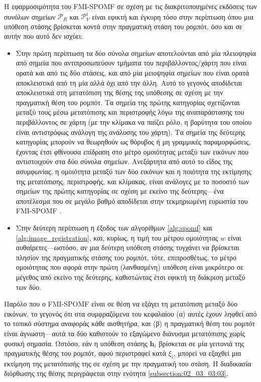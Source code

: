 Η εφαρμοσιμότητα του FMI-SPOMF σε σχέση με τις διακριτοποιημένες εκδόσεις των
συνόλων σημείων $\mathcal{P}_R$ και $\mathcal{P}_V^i$ είναι εφικτή και
έγκυρη τόσο στην περίπτωση όπου μια υπόθεση στάσης βρίσκεται κοντά στην
πραγματική στάση του ρομπότ, όσο και σε αυτήν που αυτό δεν ισχύει:

\begin{itemize}
  \item Στην πρώτη περίπτωση τα δύο σύνολα σημείων αποτελούνται
        από μία πλειοψηφία από σημεία που αντιπροσωπεύουν τμήματα του
        περιβάλλοντος/χάρτη που είναι ορατά και από τις δύο στάσεις, και από μία
        μειοψηφία σημείων που είναι ορατά αποκλειστικά από τη μία αλλά όχι από
        την άλλη. Αυτό το γεγονός αποδίδεται αποκλειστικά στη μετατόπιση της
        θέσης της υπόθεσης σε σχέση με την πραγματική θέση του ρομπότ. Τα
        σημεία της πρώτης κατηγορίας σχετίζονται μεταξύ τους μέσω
        μετατόπισης και περιστροφής λόγω της αναπαράστασης του περιβάλλοντος
        σε χάρτη (με την κλίμακα να παίζει ρόλο, η βαρύτητα του οποίου είναι
        αντιστρόφως ανάλογη της ανάλυσης του χάρτη). Τα σημεία της
        δεύτερης κατηγορίας μπορούν να θεωρηθούν ως θόρυβος ή μη γραμμικές
        παραμορφώσεις, έχοντας έτσι φθίνουσα επίδραση στο μέτρο ομοιότητας
        μεταξύ των εικόνων που αντιστοιχούν στα δύο σύνολα σημείων. Ανεξάρτητα
        από αυτό το είδος της ασυμφωνίας, η ομοιότητα μεταξύ των δύο εικόνων
        και η ποιότητα της εκτίμησης της μετατόπισης, περιστροφής, και κλίμακας,
        είναι ανάλογες με το ποσοστό των σημείων της πρώτης κατηγορίας σε
        σχέση με εκείνο της δεύτερης---ένα αποτέλεσμα που σε μεγάλο βαθμό
        αποδίδεται στην τεκμηριωμένη ευρωστία του FMI-SPOMF
        \cite{Qin-ShengChen1994a}.
  \item Στην δεύτερη περίπτωση η έξοδος των αλγορίθμων \ref{alg:spomf} και
        \ref{alg:image_registration}, και, κυρίως, η τιμή του μέτρου ομοιότητας
        $w$ είναι αυθαίρετες---ωστόσο, αν μια δεύτερη υπόθεση στάσης τυγχάνει να
        βρίσκεται πλησίον της πραγματικής στάσης του ρομπότ, τότε, επιπροσθέτως,
        το μέτρο ομοιότητας που αφορά στην πρώτη (λανθασμένη) υπόθεση είναι
        μικρότερο σε μέγεθος από εκείνο της δεύτερης, καθιστώντας έτσι εφικτή
        τη διάκριση μεταξύ των δύο.
\end{itemize}

Παρόλο που ο FMI-SPOMF είναι σε θέση να εξάγει τη μετατόπιση μεταξύ δύο
εικόνων, το γεγονός ότι στα συμφραζόμενα του κεφαλαίου (α) αυτές έχουν ληφθεί
από το τοπικό σύστημα αναφοράς κάθε αισθητήρα, και (β) η πραγματική θέση του
ρομπότ είναι άγνωστη---αυτά τα δύο καθιστούν το εξαγώμενο διάνυσμα μετατόπισης
χωρίς φυσική σημασία. Ωστόσο, εάν η υπόθεση στάσης $\bm{h}_i$ βρίσκεται σε μία
γειτονιά της πραγματικής θέσης του ρομπότ, αφού περιστραφεί κατά
$\xi_i$, μπορεί να εξαχθεί μια εκτίμηση της μετατόπισής της σε σχέση με την
πραγματική του στάση. Η διαδικασία διόρθωσης της θέσης περιγράφεται στην ενότητα
\ref{subsection:02_03_03:03}.


